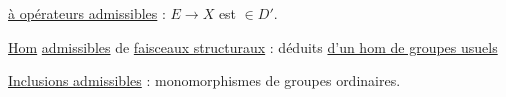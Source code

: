 \uline{ à opérateurs admissibles} :   $E\to X$ est $\in D'$.

\uline{Hom} \uline{admissibles} de  \uline{faisceaux structuraux} : déduits
\uline{d'un hom de groupes usuels}

 \uline{Inclusions admissibles} :  monomorphismes
de groupes ordinaires.
